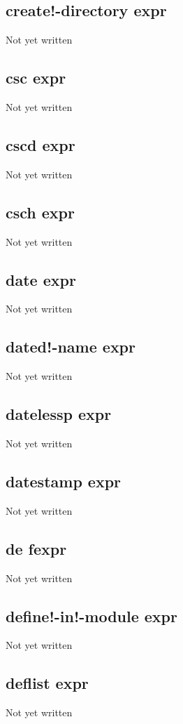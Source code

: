 \documentclass[a4paper,11pt]{article}
\begin{document}
{\subsection{\ttfamily create!-directory expr}
   Not yet written

\subsection{\ttfamily csc expr}
   Not yet written

\subsection{\ttfamily cscd expr}
   Not yet written

\subsection{\ttfamily csch expr}
   Not yet written

\subsection{\ttfamily date expr}
   Not yet written

\subsection{\ttfamily dated!-name expr}
   Not yet written

\subsection{\ttfamily datelessp expr}
   Not yet written

\subsection{\ttfamily datestamp expr}
   Not yet written

\subsection{\ttfamily de fexpr}
   Not yet written

\subsection{\ttfamily define!-in!-module expr}
   Not yet written

\subsection{\ttfamily deflist expr}
   Not yet written

}
\end{document}
